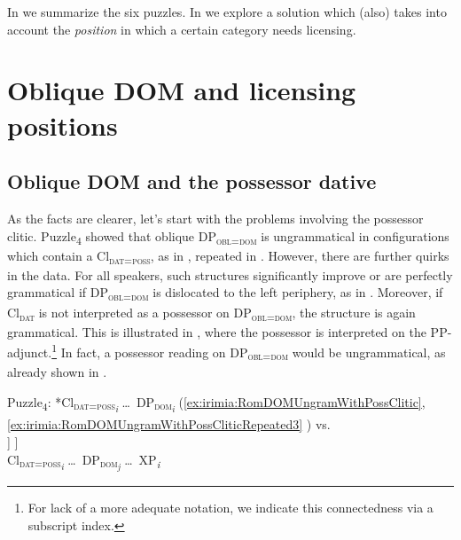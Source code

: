 \documentclass[output=paper,colorlinks,citecolor=brown,draft,draftmode]{langscibook}
\begin{document}
In  we summarize the six puzzles. In  we explore a solution which (also) takes into account the \textit{position} in which a certain category needs licensing.




\section{Oblique DOM and licensing positions}\label{sec:irimia:ObliqueDOMandlicensingPositionSection5}

\subsection{Oblique DOM and the possessor dative}\label{subsec:irimia:ObliqueDOMPossessorClSubsection5.1}

As the facts are clearer, let's start with the problems involving the possessor clitic. Puzzle\textsubscript{4} showed that oblique DP\textsubscript{\textsc{obl=dom}} is ungrammatical in configurations which contain a Cl\textsubscript{\textsc{dat=poss}}, as in , repeated in . However, there are further quirks in the data. For all speakers, such structures significantly improve or are perfectly grammatical if DP\textsubscript{\textsc{obl=dom}} is dislocated to the left periphery, as in . Moreover, if Cl\textsubscript{\textsc{dat}} is not interpreted as a possessor on DP\textsubscript{\textsc{obl=dom}}, the structure is again grammatical. This is illustrated in , where the possessor is interpreted on the PP-adjunct.\footnote{For lack of a more adequate notation, we indicate this connectedness via a subscript index.} In fact, a possessor reading on DP\textsubscript{\textsc{obl=dom}} would be ungrammatical, as already shown in .


\ea Puzzle\textsubscript{\textsc{4}}:  *Cl\textsubscript{\textsc{dat=poss}\textsubscript{\textit{i}}}  \ldots\, DP\textsubscript{\textsc{dom}\textsubscript{\textit{i}}}
(\ref{ex:irimia:RomDOMUngramWithPossClitic}, \ref{ex:irimia:RomDOMUngramWithPossCliticRepeated3}
) vs. \\
\hskip 1.5cm \Checkmark [\textsubscript{\textsc{cp}} DP\textsubscript{\textsc{dom}\textsubscript{\textit{i}}} \ldots\,[\textsubscript{C\textsuperscript{0}}\ldots\, [Cl\textsubscript{\textsc{dat=poss}\textsubscript{\textit{i}}}  \ldots\, ] ] ] 
\\
\hskip 1.5cm \Checkmark Cl\textsubscript{\textsc{dat=poss}\textsubscript{\textit{i}}}  \ldots\, DP\textsubscript{\textsc{dom}\textsubscript{\textit{j}}} \ldots\, XP\textsubscript{\textit{i}}  
\\
\end{document}
